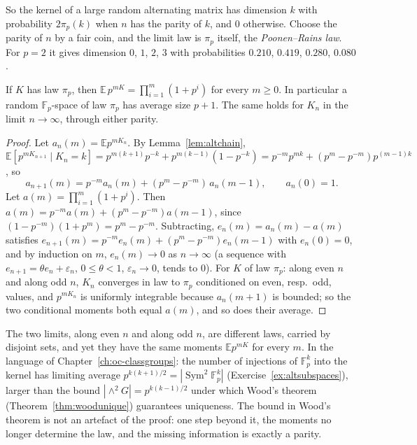 So the kernel of a large random alternating matrix has dimension $k$ with probability $2\pi_p(k)$ when $n$ has the parity of $k$, and $0$ otherwise. Choose the parity of $n$ by a fair coin, and the limit law is $\pi_p$ itself, the \emph{Poonen--Rains law}. For $p=2$ it gives dimension $0$, $1$, $2$, $3$ with probabilities $0.210$, $0.419$, $0.280$, $0.080$.

\begin{corollary}\label{cor:prmoments}
If $K$ has law $\pi_p$, then $\mathbb E\,p^{mK}=\prod_{i=1}^m(1+p^i)$ for every $m\ge0$. In particular a random $\mathbb F_p$-space of law $\pi_p$ has average size $p+1$. The same holds for $K_n$ in the limit $n\to\infty$, through either parity.
\end{corollary}
\begin{proof}
Let $a_n(m)=\mathbb Ep^{mK_n}$. By Lemma~\ref{lem:altchain}, $\mathbb E[p^{mK_{n+1}}\mid K_n=k]=p^{m(k+1)}p^{-k}+p^{m(k-1)}(1-p^{-k})=p^{-m}p^{mk}+(p^m-p^{-m})p^{(m-1)k}$, so
\[
a_{n+1}(m)=p^{-m}a_n(m)+(p^m-p^{-m})\,a_n(m-1),\qquad a_n(0)=1.
\]
Let $a(m)=\prod_{i=1}^m(1+p^i)$. Then $a(m)=p^{-m}a(m)+(p^m-p^{-m})a(m-1)$, since $(1-p^{-m})(1+p^m)=p^m-p^{-m}$. Subtracting, $e_n(m)=a_n(m)-a(m)$ satisfies $e_{n+1}(m)=p^{-m}e_n(m)+(p^m-p^{-m})e_n(m-1)$ with $e_n(0)=0$, and by induction on $m$, $e_n(m)\to0$ as $n\to\infty$ (a sequence with $e_{n+1}=\theta e_n+\varepsilon_n$, $0\le\theta<1$, $\varepsilon_n\to0$, tends to $0$). For $K$ of law $\pi_p$: along even $n$ and along odd $n$, $K_n$ converges in law to $\pi_p$ conditioned on even, resp.\ odd, values, and $p^{mK_n}$ is uniformly integrable because $a_n(m+1)$ is bounded; so the two conditional moments both equal $a(m)$, and so does their average.
\end{proof}

\begin{remark}\label{rem:parity}
The two limits, along even $n$ and along odd $n$, are different laws, carried by disjoint sets, and yet they have the same moments $\mathbb Ep^{mK}$ for every $m$. In the language of Chapter~\ref{ch:oc-classgroups}: the number of injections of $\mathbb F_p^k$ into the kernel has limiting average $p^{k(k+1)/2}=|\operatorname{Sym}^2\mathbb F_p^k|$ (Exercise~\ref{ex:altsubspaces}), larger than the bound $|\wedge^2G|=p^{k(k-1)/2}$ under which Wood's theorem (Theorem~\ref{thm:woodunique}) guarantees uniqueness. The bound in Wood's theorem is not an artefact of the proof: one step beyond it, the moments no longer determine the law, and the missing information is exactly a parity.
\end{remark}


